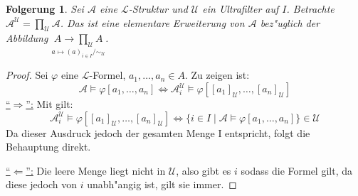 \documentclass[a4paper,12pt,numbers=noenddot,parskip=full]{scrartcl}
\newcommand{\scrL}{\mathcal{L}}
\newcommand{\scrA}{\mathcal{A}}
\newcommand{\scrU}{\mathcal{U}}
\theoremstyle{dotless}
\newtheorem{corollary}[theorem]{Folgerung}
\begin{document}
\begin{corollary}
	Sei $\scrA$ eine $\scrL$-Struktur und $\scrU$ ein Ultrafilter auf $I$. Betrachte $\scrA^\scrU = \prod\limits_{\scrU} \scrA$. Das ist eine elementare Erweiterung von $\scrA$ bez"uglich der Abbildung $\underset{a \longmapsto (a)_{i \in I}/\sim_\scrU}{A \longrightarrow \prod\limits_{\scrU} A}$.
\end{corollary}
\begin{proof}
	Sei $\varphi$ eine $\scrL$-Formel, $a_1, \dots, a_n \in A$. Zu zeigen ist:
	\begin{equation*}
		\scrA \models \varphi[a_1, \dots, a_n] \Longleftrightarrow \scrA_i^\scrU \models \varphi[[a_1]_\scrU , \dots, [a_n]_\scrU]
	\end{equation*}
	\underline{"`$\Rightarrow$"':} Mit  gilt:
	\begin{equation*}
		\scrA_i^\scrU \models \varphi[[a_1]_\scrU , \dots, [a_n]_\scrU] \Longleftrightarrow \{i \in I \mid \scrA \models \varphi[a_1, \dots, a_n] \} \in \scrU
	\end{equation*}
	Da dieser Ausdruck jedoch der gesamten Menge I entspricht, folgt die Behauptung direkt.
	
	\underline{"`$\Leftarrow$"':} Die leere Menge liegt nicht in $\scrU$, also gibt es $i$ sodass die Formel gilt, da diese jedoch von $i$ unabh"angig ist, gilt sie immer.
\end{proof}
\end{document}

